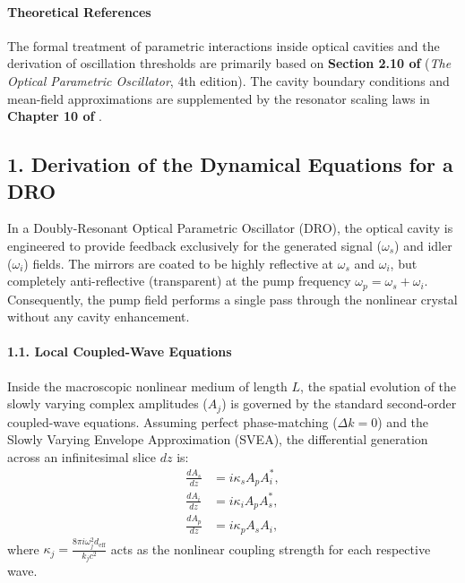\begin{resolucao}[Solution]

    \paragraph*{Theoretical References}
    The formal treatment of parametric interactions inside optical cavities and the derivation of oscillation thresholds are primarily based on \textbf{Section 2.10 of } (\textit{The Optical Parametric Oscillator}, 4th edition). The cavity boundary conditions and mean-field approximations are supplemented by the resonator scaling laws in \textbf{Chapter 10 of }.

    \subsection*{1. Derivation of the Dynamical Equations for a DRO}

    In a Doubly-Resonant Optical Parametric Oscillator (DRO), the optical cavity is engineered to provide feedback exclusively for the generated signal ($\omega_s$) and idler ($\omega_i$) fields. The mirrors are coated to be highly reflective at $\omega_s$ and $\omega_i$, but completely anti-reflective (transparent) at the pump frequency $\omega_p = \omega_s + \omega_i$. Consequently, the pump field performs a single pass through the nonlinear crystal without any cavity enhancement.

    \paragraph*{1.1. Local Coupled-Wave Equations}
    Inside the macroscopic nonlinear medium of length $L$, the spatial evolution of the slowly varying complex amplitudes ($A_j$) is governed by the standard second-order coupled-wave equations. Assuming perfect phase-matching ($\Delta k = 0$) and the Slowly Varying Envelope Approximation (SVEA), the differential generation across an infinitesimal slice $dz$ is:
    \begin{align}
        \frac{dA_s}{dz} &= i \kappa_s A_p A_i^*, \label{eq:local_s} \\
        \frac{dA_i}{dz} &= i \kappa_i A_p A_s^*, \label{eq:local_i} \\
        \frac{dA_p}{dz} &= i \kappa_p A_s A_i, \label{eq:local_p}
    \end{align}
    where $\kappa_j = \frac{8\pi i \omega_j^2 d_{\mathrm{eff}}}{k_j c^2}$ acts as the nonlinear coupling strength for each respective wave.


\end{resolucao}
